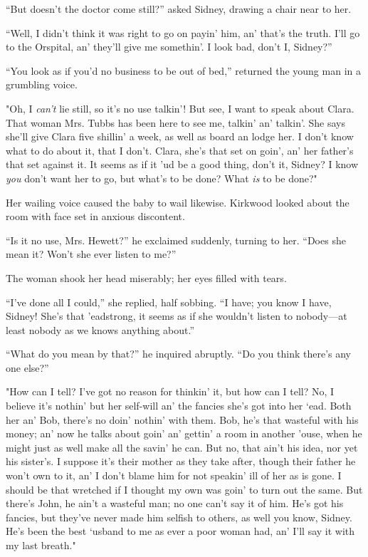 ``But doesn't the doctor come still?'' asked Sidney, drawing a chair
near to her.

``Well, I didn't think it was right to go on payin' him, an' that's the
truth. I'll go to the Orspital, an' they'll give me somethin'. I look
bad, don't I, Sidney?''

``You look as if you'd no business to be out of bed,'' returned the
young man in a grumbling voice.

"Oh, I \emph{can't} lie still, so it's no use talkin'! But see, I want
to speak about Clara. That woman Mrs. Tubbs has been here to see me,
talkin' an' talkin'. She says she'll give Clara five shillin' a week, as
well as board an lodge her. I don't know what to do about it, that I
don't. Clara, she's that set on goin', an' her father's that set against
it. It seems as {\protect\hypertarget{39}{}{}}if it 'ud be a good thing,
don't it, Sidney? I know \emph{you} don't want her to go, but what's to
be done? What \emph{is} to be done?"

Her wailing voice caused the baby to wail likewise. Kirkwood looked
about the room with face set in anxious discontent.

``Is it no use, Mrs. Hewett?'' he exclaimed suddenly, turning to her.
``Does she mean it? Won't she ever listen to me?''

The woman shook her head miserably; her eyes filled with tears.

``I've done all I could,'' she replied, half sobbing. ``I have; you know
I have, Sidney! She's that 'eadstrong, it seems as if she wouldn't
listen to nobody---at least nobody as we knows anything about.''

``What do you mean by that?'' he inquired abruptly. ``Do you think
there's any one else?''

"How can I tell? I've got no reason for thinkin' it, but how can I tell?
No, I believe it's nothin' but her self-will an' the fancies she's got
into her `ead. Both her an' Bob, there's no doin' nothin' with them.
{\protect\hypertarget{40}{}{}}Bob, he's that wasteful with his money;
an' now he talks about goin' an' gettin' a room in another 'ouse, when
he might just as well make all the savin' he can. But no, that ain't his
idea, nor yet his sister's. I suppose it's their mother as they take
after, though their father he won't own to it, an' I don't blame him for
not speakin' ill of her as is gone. I should be that wretched if I
thought my own was goin' to turn out the same. But there's John, he
ain't a wasteful man; no one can't say it of him. He's got his fancies,
but they've never made him selfish to others, as well you know, Sidney.
He's been the best `usband to me as ever a poor woman had, an' I'll say
it with my last breath."

